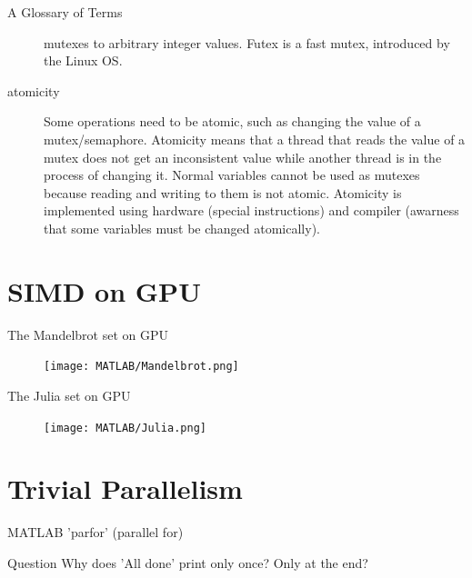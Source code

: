 \documentclass[pdflatex,colorlinks,landscape]{beamer}
\renewcommand\emph[1]{{\color{magenta}#1}}
\begin{document}
\begin{frame}[allowframebreaks]{A Glossary of Terms}
\begin{description}
    mutexes to arbitrary integer values. \emph{Futex} is a \emph{fast mutex},
    introduced by the Linux OS.
  \item[atomicity] Some operations need to be atomic, such as changing
    the value of a mutex/semaphore. Atomicity means that a thread that
    reads the value of a mutex does not get an inconsistent value
    while another thread is {\color{red} in the process of changing it}.
    Normal variables cannot be used as mutexes because reading
    and writing to them {\color{red}is not atomic}. Atomicity is implemented
    using hardware (special instructions) and compiler (awarness that some
    variables must be changed atomically).
  \end{description}
\end{frame}

\section{SIMD on GPU}

\begin{frame}{The Mandelbrot set on GPU}
  \begin{figure}
    \texttt{[image: MATLAB/Mandelbrot.png]}
  \end{figure}
\end{frame}

\begin{frame}{The Julia set on GPU}
  \begin{figure}
    \texttt{[image: MATLAB/Julia.png]}
  \end{figure}
\end{frame}

\section{Trivial Parallelism}

\begin{frame}[allowframebreaks]{MATLAB 'parfor' (parallel for)}
  \begin{small}
    
  \end{small}
  \begin{tiny}
  \end{tiny}
  \begin{block}{Question}
    Why does 'All done' print only once? Only at the end?
  \end{block}
\end{frame}
\end{document}
